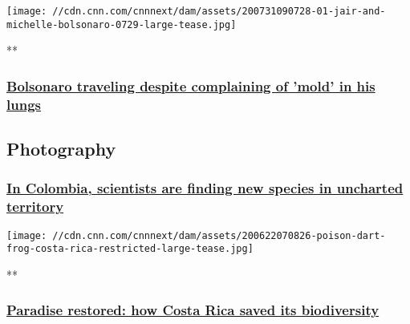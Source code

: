 \href{/videos/world/2020/07/31/brazil-jair-michelle-bolsonaro-traveling-coronavirus-infection-lungs-npw-tsr-intl-vpx.cnn}{}

\texttt{[image: //cdn.cnn.com/cnnnext/dam/assets/200731090728-01-jair-and-michelle-bolsonaro-0729-large-tease.jpg]}

**

\hypertarget{bolsonaro-traveling-despite-complaining-of-mold-in-his-lungs}{%
\subsubsection{\texorpdfstring{\href{/videos/world/2020/07/31/brazil-jair-michelle-bolsonaro-traveling-coronavirus-infection-lungs-npw-tsr-intl-vpx.cnn}{Bolsonaro
traveling despite complaining of 'mold' in his
lungs}}{Bolsonaro traveling despite complaining of 'mold' in his lungs}}\label{bolsonaro-traveling-despite-complaining-of-mold-in-his-lungs}}

\hypertarget{photography}{%
\subsection{Photography}\label{photography}}

\hypertarget{in-colombia-scientists-are-finding-new-species-in-uncharted-territory-1}{%
\subsubsection{\texorpdfstring{\href{/2020/07/30/americas/gallery/mauricio-diazgranados-profile-gallery/index.html}{In
Colombia, scientists are finding new species in uncharted
territory}}{In Colombia, scientists are finding new species in uncharted territory}}\label{in-colombia-scientists-are-finding-new-species-in-uncharted-territory-1}}

\href{/2020/07/27/americas/gallery/costa-rica-reforestation-c2e-spc/index.html}{}

\texttt{[image: //cdn.cnn.com/cnnnext/dam/assets/200622070826-poison-dart-frog-costa-rica-restricted-large-tease.jpg]}

**

\hypertarget{paradise-restored-how-costa-rica-saved-its-biodiversity}{%
\subsubsection{\texorpdfstring{\href{/2020/07/27/americas/gallery/costa-rica-reforestation-c2e-spc/index.html}{Paradise
restored: how Costa Rica saved its
biodiversity}}{Paradise restored: how Costa Rica saved its biodiversity}}\label{paradise-restored-how-costa-rica-saved-its-biodiversity}}

